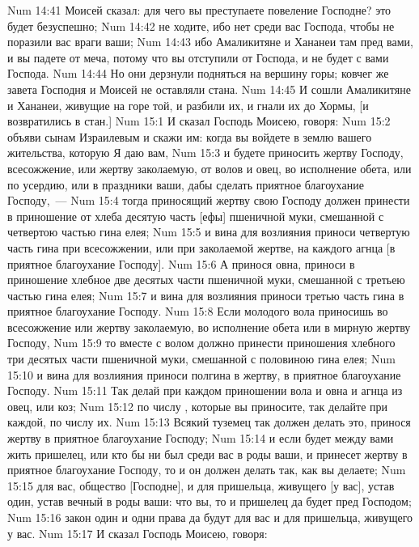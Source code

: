 \vs Num 14:41 Моисей сказал: для чего вы преступаете повеление Господне? это будет безуспешно;
\vs Num 14:42 не ходите, ибо нет среди вас Господа, чтобы не поразили вас враги ваши;
\vs Num 14:43 ибо Амаликитяне и Хананеи там пред вами, и вы падете от меча, потому что вы отступили от Господа, и не будет с вами Господа.
\vs Num 14:44 Но они дерзнули подняться на вершину горы; ковчег же завета Господня и Моисей не оставляли стана.
\vs Num 14:45 И сошли Амаликитяне и Хананеи, живущие на горе той, и разбили их, и гнали их до Хормы, [и возвратились в стан.]
\vs Num 15:1 И сказал Господь Моисею, говоря:
\vs Num 15:2 объяви сынам Израилевым и скажи им: когда вы войдете в землю вашего жительства, которую Я даю вам,
\vs Num 15:3 и будете приносить жертву Господу, всесожжение, или жертву заколаемую, от волов и овец, во исполнение обета, или по усердию, или в праздники ваши, дабы сделать приятное благоухание Господу,~---
\vs Num 15:4 тогда приносящий жертву свою Господу должен принести в приношение от хлеба десятую часть [ефы] пшеничной муки, смешанной с четвертою частью гина елея;
\vs Num 15:5 и вина для возлияния приноси четвертую часть гина при всесожжении, или при заколаемой жертве, на каждого агнца [в приятное благоухание Господу].
\vs Num 15:6 А принося овна, приноси в приношение хлебное две десятых части  пшеничной муки, смешанной с третьею частью гина елея;
\vs Num 15:7 и вина для возлияния приноси третью часть гина в приятное благоухание Господу.
\vs Num 15:8 Если молодого вола приносишь во всесожжение или жертву заколаемую, во исполнение обета или в мирную жертву Господу,
\vs Num 15:9 то вместе с волом должно принести приношения хлебного три десятых части  пшеничной муки, смешанной с половиною гина елея;
\vs Num 15:10 и вина для возлияния приноси полгина в жертву, в приятное благоухание Господу.
\vs Num 15:11 Так делай при каждом приношении вола и овна и агнца из овец, или коз;
\vs Num 15:12 по числу , которые вы приносите, так делайте при каждой, по числу их.
\vs Num 15:13 Всякий туземец так должен делать это, принося жертву в приятное благоухание Господу;
\vs Num 15:14 и если будет между вами жить пришелец, или кто бы ни был среди вас в роды ваши, и принесет жертву в приятное благоухание Господу, то и он должен делать так, как вы делаете;
\vs Num 15:15 для вас, общество [Господне], и для пришельца, живущего [у вас], устав один, устав вечный в роды ваши: что вы, то и пришелец да будет пред Господом;
\vs Num 15:16 закон один и одни права да будут для вас и для пришельца, живущего у вас.
\rsbpar\vs Num 15:17 И сказал Господь Моисею, говоря:
